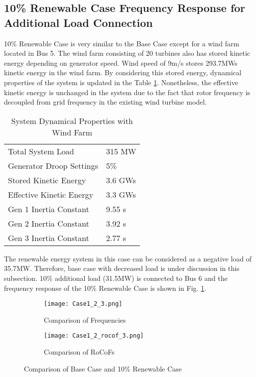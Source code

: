 \subsection{10\% Renewable Case Frequency Response for Additional Load Connection}
10\% Renewable Case is very similar to the Base Case except for a wind farm located in Bus 5. The wind farm consisting of 20 turbines also has stored kinetic energy depending on generator speed. Wind speed of 9m/s stores 293.7MWs kinetic energy in the wind farm. By considering this stored energy, dynamical properties of the system is updated in the Table \ref{systemdynamicaldatamod}. Nonetheless, the effective kinetic energy is unchanged in the system due to the fact that rotor frequency is decoupled from grid frequency in the existing wind turbine model.\par
\begin{table}[h]
	\centering
	\begin{tabular}{ll}
		\hline
		Total System Load                      & 315 MW    \\
		Generator Droop Settings               & 5\%       \\
		Stored Kinetic Energy                  & 3.6 GWs \\
		Effective Kinetic Energy               & 3.3 GWs \\
		Gen 1 Inertia Constant                 & 9.55 s  \\
		Gen 2 Inertia Constant                 & 3.92 s  \\
		Gen 3 Inertia Constant                 & 2.77 s  \\ \hline
	\end{tabular}
	\caption{System Dynamical Properties with Wind Farm}
	\label{systemdynamicaldatamod}
\end{table}
The renewable energy system in this case can be considered as a negative load of 35.7MW. Therefore, base case with decreased load is under discussion in this subsection. 10\% additional load (31.5MW) is connected to Bus 6 and the frequency response of the 10\% Renewable Case is shown in Fig. \ref{Case1_2_freq}. \par
\begin{figure}[h]
	\centering
		\begin{subfigure}{0.9\textwidth} %
			\centering
		\texttt{[image: Case1\_2\_3.png]}
		\caption{Comparison of Frequencies}		
		\label{Case1_2_freq}
		\end{subfigure}
		\vspace{0.1em} %
	\begin{subfigure}{0.9\textwidth}
\centering	\texttt{[image: Case1\_2\_rocof\_3.png]}
	\caption{Comparison of RoCoFs}
	\label{Case1_2_rocof}	
	\end{subfigure}
	\caption{Comparison of Base Case and 10\% Renewable Case}
\end{figure}
